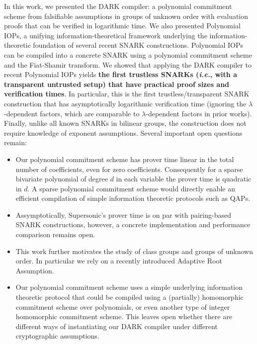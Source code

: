 In this work, we presented the DARK compiler: a polynomial commitment scheme from falsifiable assumptions in groups of unknown order with evaluation proofs that can be verified in logarithmic time. We also presented Polynomial IOPs, a unifying information-theoretical framework underlying the information-theoretic foundation of several recent SNARK constructions. Polynomial IOPs can be compiled into a concrete SNARK using a polynomial commitment scheme and the Fiat-Shamir transform. We showed that applying the DARK compiler to recent Polynomial IOPs yields \textbf{the first trustless SNARKs (\emph{i.e.}, with a transparent untrusted setup) that have practical proof sizes and verification times}. In particular, this is the first trustless/transparent SNARK construction that has asymptotically logarithmic verification time (ignoring the $\lambda$-dependent factors, which are comparable to $\lambda$-dependent factors in prior works). Finally, unlike all known SNARKs in bilinear groups, the construction does not require knowledge of exponent assumptions.
Several important open questions remain:

\begin{itemize}
    \item Our polynomial commitment scheme has prover time linear in the total number of coefficients, even for zero coefficients. Consequently for a sparse bivariate polynomial of degree $d$ in each variable the prover time is quadratic in $d$. A sparse polynomial commitment scheme would directly enable an efficient compilation of simple information theoretic protocols such as QAPs.
    \item Assymptotically, \textsf{Supersonic}'s prover time is on par with pairing-based SNARK constructions, however, a concrete implementation and performance comparison remains open.
    \item This work further motivates the study of class groups and groups of unknown order. In particular we rely on a recently introduced Adaptive Root Assumption.
    \item Our polynomial commitment scheme uses a simple underlying information theoretic protocol that could be compiled using a (partially) homomorphic commitment scheme over polynomials, or even another type of integer homomorphic commitment scheme. This leaves open whether there are different ways of instantiating our DARK compiler under different cryptographic assumptions. 
    
\end{itemize}


